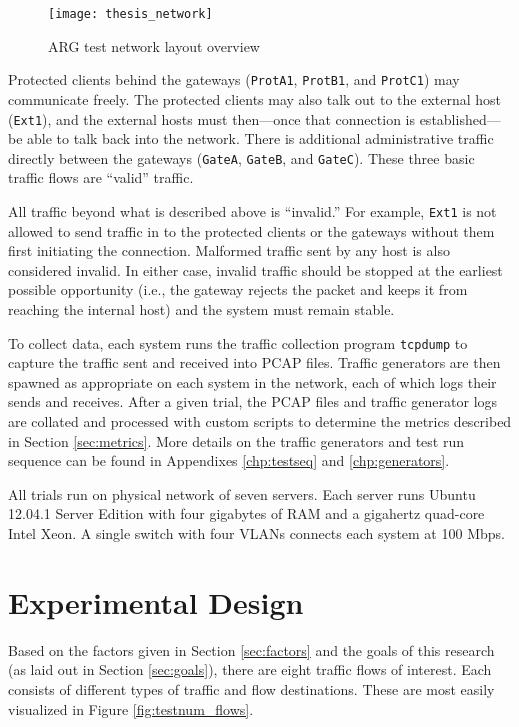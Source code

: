 \begin{figure}
	\centering
	\caption{\ac{ARG} test network layout overview}
	\label{fig:argnetwork}
	\texttt{[image: thesis\_network]}
\end{figure}

\par Protected clients behind the gateways (\texttt{ProtA1}, \texttt{ProtB1}, and \texttt{ProtC1}) may communicate freely. The protected clients may also talk out to the external host (\texttt{Ext1}), and the external hosts must then---once that connection is established---be able to talk back into the network. There is additional administrative traffic directly between the gateways (\texttt{GateA}, \texttt{GateB}, and \texttt{GateC}). These three basic traffic flows are ``valid'' traffic.

\par All traffic beyond what is described above is ``invalid.'' For example, \texttt{Ext1} is not allowed to send traffic in to the protected clients or the gateways without them first initiating the connection. Malformed traffic sent by any host is also considered invalid. In either case, invalid traffic should be stopped at the earliest possible opportunity (i.e., the gateway rejects the packet and keeps it from reaching the internal host) and the system must remain stable.

\par To collect data, each system runs the traffic collection program \texttt{tcpdump} to capture the traffic sent and received into \ac{PCAP} files. Traffic generators are then spawned as appropriate on each system in the network, each of which logs their sends and receives. After a given trial, the \ac{PCAP} files and traffic generator logs are collated and processed with custom scripts to determine the metrics described in Section \ref{sec:metrics}. More details on the traffic generators and test run sequence can be found in Appendixes \ref{chp:testseq} and \ref{chp:generators}.

\par All trials run on physical network of seven servers. Each server runs Ubuntu 12.04.1 Server Edition with four gigabytes of \ac{RAM} and a  gigahertz quad-core Intel Xeon. A single switch with four \acp{VLAN} connects each system at 100 \ac{Mbps}.

\section{Experimental Design}
\label{sec:exp_design}
\par Based on the factors given in Section \ref{sec:factors} and the goals of this research (as laid out in Section \ref{sec:goals}), there are eight traffic flows of interest. Each consists of different types of traffic and flow destinations. These are most easily visualized in Figure \ref{fig:testnum_flows}.

